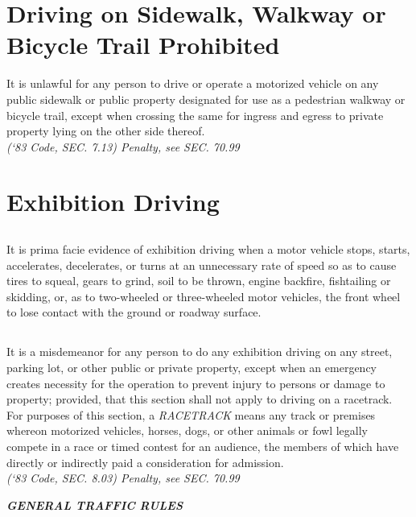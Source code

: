 \documentclass[code.tex]{subfiles}
\begin{document}
\section{Driving on Sidewalk, Walkway or Bicycle Trail Prohibited}
It is unlawful for any person to drive or operate a motorized vehicle on any public sidewalk or public property designated for use as a pedestrian walkway or bicycle trail, except when crossing the same for ingress and egress to private property lying on the other side thereof.\\
\emph{(‘83 Code, SEC. 7.13) Penalty, see SEC. 70.99}
\section{Exhibition Driving}
\subsection{}
It is prima facie evidence of exhibition driving when a motor vehicle stops, starts, accelerates, decelerates, or turns at an unnecessary rate of speed so as to cause tires to squeal, gears to grind, soil to be thrown, engine backfire, fishtailing or skidding, or, as to two-wheeled or three-wheeled motor vehicles, the front wheel to lose contact with the ground or roadway surface.
\subsection{}
It is a misdemeanor for any person to do any exhibition driving on any street, parking lot, or other public or private property, except when an emergency creates necessity for the operation to prevent injury to persons or damage to property; provided, that this section shall not apply to driving on a racetrack.  For purposes of this section, a \emph{RACETRACK} means any track or premises whereon motorized vehicles, horses, dogs, or other animals or fowl legally compete in a race or timed contest for an audience, the members of which have directly or indirectly paid a consideration for admission.\\
\emph{(‘83 Code, SEC. 8.03) Penalty, see SEC. 70.99}\\

\begin{center}
\emph{\textbf{\LARGE{GENERAL TRAFFIC RULES}}}
\end{center}
\setcounter{section}{14}
\end{document}

